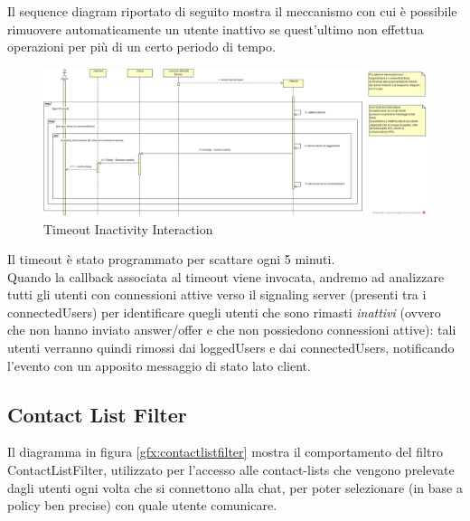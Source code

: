 Il sequence diagram riportato di seguito mostra il meccanismo con cui è possibile rimuovere automaticamente un utente inattivo se quest'ultimo non effettua operazioni per più di un certo periodo di tempo.

\begin{figure}[!htpb]
	\centering
	\includegraphics[scale = .35]{img/sequence_timeout.png}
	\caption{Timeout Inactivity Interaction}
	\label{gfx:timeoutinteraction}
\end{figure}

Il timeout è stato programmato per scattare ogni 5 minuti.\\
Quando la callback associata al timeout viene invocata, andremo ad analizzare tutti gli utenti con connessioni attive verso il signaling server (presenti tra i connectedUsers) per identificare quegli utenti che sono rimasti \textit{inattivi} (ovvero che non hanno inviato answer/offer e che non possiedono connessioni attive): tali utenti verranno quindi rimossi dai loggedUsers e dai connectedUsers, notificando l'evento con un apposito messaggio di stato lato client.\\

\subsection{Contact List Filter}

Il diagramma in figura \ref{gfx:contactlistfilter} mostra il comportamento del filtro ContactListFilter, utilizzato per l'accesso alle contact-lists che vengono prelevate dagli utenti ogni volta che si connettono alla chat, per poter selezionare (in base a policy ben precise) con quale utente comunicare.

